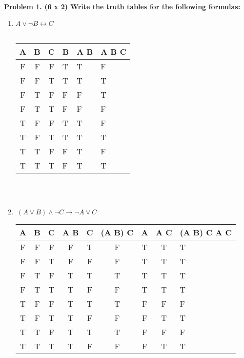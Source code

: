 \documentclass[12pt,twoside]{article}
\begin{document}
\newpage
\textbf{Problem 1. (6 x 2) Write the truth tables for the following formulas:}
\begin{enumerate}
    \item
    $A  \lor  \neg B \leftrightarrow C$\\
	\\
\begin{tabular}{|c|c|c|p{1cm}|p{2cm}|p{2.5cm}|}
		\hline \rule[-2ex]{0pt}{5.5ex} A & B & C & \lnot B & A \lor \lnot B & A \lor \lnot B \leftrightarrow C \\
		\hline \rule[-2ex]{0pt}{5.5ex} F & F & F & T & T & F \\
		\hline \rule[-2ex]{0pt}{5.5ex} F & F & T & T & T & T \\
		\hline \rule[-2ex]{0pt}{5.5ex} F & T & F & F & F & T \\
		\hline \rule[-2ex]{0pt}{5.5ex} F & T & T & F & F & F \\
		\hline \rule[-2ex]{0pt}{5.5ex} T & F & F & T & T & F \\
		\hline \rule[-2ex]{0pt}{5.5ex} T & F & T & T & T & T \\
		\hline \rule[-2ex]{0pt}{5.5ex} T & T & F & F & T & F \\
		\hline \rule[-2ex]{0pt}{5.5ex} T & T & T & F & T & T \\
		\hline
	\end{tabular} \\
	\\
    \item $\ (A \lor B) \land \lnot C \rightarrow \lnot A \lor C$\\

	\begin{tabular}{|c|c|c|c|c|c|c|c|p{2.0cm}|}
		\hline A & B & C & A \lor B & \lnot C & (A \lor B) \land \lnot C & \lnot A & \lnot A \lor C & (A \lor B) \land \lnot C \to \lnot A \lor C \\
		\hline F & F & F & F & T & F & T & T & T \\
		\hline F & F & T & F & F & F & T & T & T \\
		\hline F & T & F & T & T & T & T & T & T \\
		\hline F & T & T & T & F & F & T & T & T \\
		\hline T & F & F & T & T & T & F & F & F \\
		\hline T & F & T & T & F & F & F & T & T \\
		\hline T & T & F & T & T & T & F & F & F \\
		\hline T & T & T & T & F & F & F & T & T \\
		\hline
	\end{tabular}

\end{enumerate}
\end{document}
